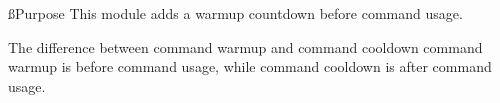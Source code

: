 
\ss{Purpose}
This module adds a warmup countdown before command usage.

\begin{note}{The difference between command warmup and command cooldown}
    command warmup is before command usage, while command cooldown is after command usage.
\end{note}
